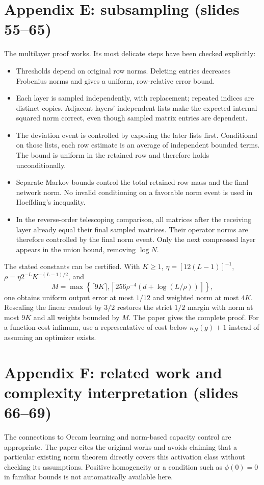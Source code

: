 \documentclass[11pt]{article}
\begin{document}
\section{Appendix E: subsampling (slides 55--65)}
The multilayer proof works. Its most delicate steps have been checked explicitly:
\begin{itemize}
\item Thresholds depend on original row norms. Deleting entries decreases Frobenius norms and gives a uniform, row-relative error bound.
\item Each layer is sampled independently, with replacement; repeated indices are distinct copies. Adjacent layers' independent lists make the expected internal squared norm correct, even though sampled matrix entries are dependent.
\item The deviation event is controlled by exposing the later lists first. Conditional on those lists, each row estimate is an average of independent bounded terms. The bound is uniform in the retained row and therefore holds unconditionally.
\item Separate Markov bounds control the total retained row mass and the final network norm. No invalid conditioning on a favorable norm event is used in Hoeffding's inequality.
\item In the reverse-order telescoping comparison, all matrices after the receiving layer already equal their final sampled matrices. Their operator norms are therefore controlled by the final norm event. Only the next compressed layer appears in the union bound, removing $\log N$.
\end{itemize}
The stated constants can be certified. With $K\geq1$, $\eta=[12(L-1)]^{-1}$, $\rho=\eta2^{-L}K^{-(L-1)/2}$, and
\[
 M=\max\!\left\{\lceil9K\rceil,
 \left\lceil256\rho^{-4}(d+\log(L/\rho))\right\rceil\right\},
\]
one obtains uniform output error at most $1/12$ and weighted norm at most $4K$. Rescaling the linear readout by $3/2$ restores the strict $1/2$ margin with norm at most $9K$ and all weights bounded by $M$. The paper gives the complete proof. For a function-cost infimum, use a representative of cost below $\kappa_N(g)+1$ instead of assuming an optimizer exists.

\section{Appendix F: related work and complexity interpretation (slides 66--69)}
The connections to Occam learning and norm-based capacity control are appropriate. The paper cites the original works and avoids claiming that a particular existing norm theorem directly covers this activation class without checking its assumptions. Positive homogeneity or a condition such as $\phi(0)=0$ in familiar bounds is not automatically available here.
\end{document}
